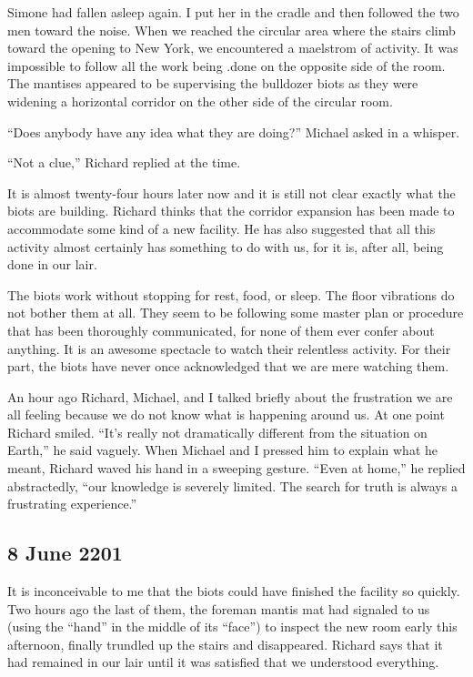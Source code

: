 \documentclass[]{article}
\begin{document}
Simone had fallen asleep again.  I put her in the cradle and then followed the two men toward the noise.  When we reached the circular area where the stairs climb toward the opening to New York, we encountered a maelstrom of activity.  It was impossible to follow all the work being .done on the opposite side of the room.  The mantises appeared to be supervising the bulldozer biots as they were widening a horizontal corridor on the other side of the circular room.

“Does anybody have any idea what they are doing?” Michael asked in a whisper.

“Not a clue,” Richard replied at the time.

It is almost twenty-four hours later now and it is still not clear exactly what the biots are building.  Richard thinks that the corridor expansion has been made to accommodate some kind of a new facility.  He has also suggested that all this activity almost certainly has something to do with us, for it is, after all, being done in our lair.

The biots work without stopping for rest, food, or sleep.  The floor vibrations do not bother them at all.  They seem to be following some master plan or procedure that has been thoroughly communicated, for none of them ever confer about anything.  It is an awesome spectacle to watch their relentless activity.  For their part, the biots have never once acknowledged that we are mere watching them.

An hour ago Richard, Michael, and I talked briefly about the frustration we are all feeling because we do not know what is happening around us.  At one point Richard smiled.  “It’s really not dramatically different from the situation on Earth,” he said vaguely.  When Michael and I pressed him to explain what he meant, Richard waved his hand in a sweeping gesture.  “Even at home,” he replied abstractedly, “our knowledge is severely limited.  The search for truth is always a frustrating experience.”

\subsection*{8 June 2201}

It is inconceivable to me that the biots could have finished the facility so quickly.  Two hours ago the last of them, the foreman mantis mat had signaled to us (using the “hand” in the middle of its “face”) to inspect the new room early this afternoon, finally trundled up the stairs and disappeared.  Richard says that it had remained in our lair until it was satisfied that we understood everything.
\end{document}
